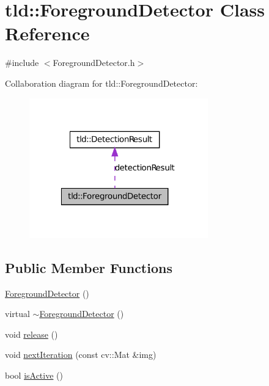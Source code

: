\hypertarget{classtld_1_1_foreground_detector}{
\section{tld::ForegroundDetector Class Reference}
\label{classtld_1_1_foreground_detector}
}


{\ttfamily \#include $<$ForegroundDetector.h$>$}



Collaboration diagram for tld::ForegroundDetector:
\nopagebreak
\begin{figure}[H]
\begin{center}
\leavevmode
\includegraphics[width=219pt]{classtld_1_1_foreground_detector__coll__graph}
\end{center}
\end{figure}
\subsection*{Public Member Functions}
\begin{DoxyCompactItemize}
\item 
\hyperlink{classtld_1_1_foreground_detector_afb086f8195e7358d8afb7c24194fc131}{ForegroundDetector} ()
\item 
virtual \hyperlink{classtld_1_1_foreground_detector_ade0fb08c42a39ce8a2482b2bacea8c02}{$\sim$ForegroundDetector} ()
\item 
void \hyperlink{classtld_1_1_foreground_detector_a0bf609b2ba46774804a929253c225aac}{release} ()
\item 
void \hyperlink{classtld_1_1_foreground_detector_a4f34509fa3a36529a39b911ed7693623}{nextIteration} (const cv::Mat \&img)
\item 
bool \hyperlink{classtld_1_1_foreground_detector_abe107144cdd28271253a431cc6a22392}{isActive} ()
\end{DoxyCompactItemize}
